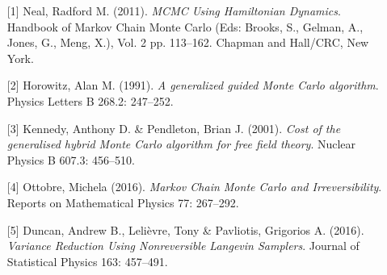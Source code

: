 \begin{talk}
\medskip

\begin{enumerate}
	\item[{[1]}] Neal, Radford M. (2011). {\it MCMC Using Hamiltonian Dynamics}. Handbook of Markov Chain Monte Carlo (Eds: Brooks, S., Gelman, A., Jones, G., Meng, X.), Vol. 2 pp. 113--162. Chapman and Hall/CRC, New York.
	\item[{[2]}] Horowitz, Alan M. (1991). {\it A generalized guided Monte Carlo algorithm}. Physics Letters B 268.2: 247--252. 
	\item[{[3]}] Kennedy, Anthony D. \& Pendleton, Brian J. (2001). {\it Cost of the generalised hybrid Monte Carlo algorithm for free field theory}. Nuclear Physics B 607.3: 456--510.
	\item[{[4]}] Ottobre, Michela (2016). {\it Markov Chain Monte Carlo and Irreversibility}. Reports on Mathematical Physics 77: 267--292.
	\item[{[5]}] Duncan, Andrew B., Leli\`evre, Tony \& Pavliotis, Grigorios A. (2016). {\it Variance Reduction Using Nonreversible Langevin Samplers}. Journal of Statistical Physics 163: 457--491. 
\end{enumerate}

\end{talk}
